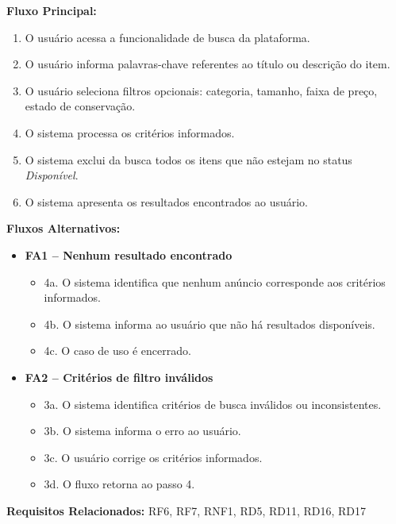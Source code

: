﻿\documentclass[12pt,a4paper]{article}
\begin{document}
\vspace{0.5em}
\noindent\textbf{Fluxo Principal:}
\begin{enumerate}[label=\arabic*.]
    \item O usuário acessa a funcionalidade de busca da plataforma.
    \item O usuário informa palavras-chave referentes ao título ou descrição do item.
    \item O usuário seleciona filtros opcionais: categoria, tamanho, faixa de preço, estado de conservação.
    \item O sistema processa os critérios informados.
    \item O sistema exclui da busca todos os itens que não estejam no status \textit{Disponível}.
    \item O sistema apresenta os resultados encontrados ao usuário.
\end{enumerate}

\vspace{0.5em}
\noindent\textbf{Fluxos Alternativos:}
\begin{itemize}[leftmargin=*]
    \item \textbf{FA1 – Nenhum resultado encontrado}
    \begin{itemize}[label={}, leftmargin=0.5cm]
        \item 4a. O sistema identifica que nenhum anúncio corresponde aos critérios informados.
        \item 4b. O sistema informa ao usuário que não há resultados disponíveis.
        \item 4c. O caso de uso é encerrado.
    \end{itemize}
    
    \item \textbf{FA2 – Critérios de filtro inválidos}
    \begin{itemize}[label={}, leftmargin=0.5cm]
        \item 3a. O sistema identifica critérios de busca inválidos ou inconsistentes.
        \item 3b. O sistema informa o erro ao usuário.
        \item 3c. O usuário corrige os critérios informados.
        \item 3d. O fluxo retorna ao passo 4.
    \end{itemize}
\end{itemize}

\vspace{0.5em}
\noindent\textbf{Requisitos Relacionados:} RF6, RF7, RNF1, RD5, RD11, RD16, RD17
\end{document}
